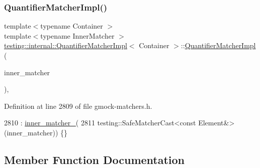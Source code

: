 \subsubsection{\texorpdfstring{Quantifier\+Matcher\+Impl()}{QuantifierMatcherImpl()}}
{\footnotesize\ttfamily template$<$typename Container $>$ \\
template$<$typename Inner\+Matcher $>$ \\
\hyperlink{classtesting_1_1internal_1_1QuantifierMatcherImpl}{testing\+::internal\+::\+Quantifier\+Matcher\+Impl}$<$ Container $>$\+::\hyperlink{classtesting_1_1internal_1_1QuantifierMatcherImpl}{Quantifier\+Matcher\+Impl} (\begin{DoxyParamCaption}\item[{Inner\+Matcher}]{inner\+\_\+matcher }\end{DoxyParamCaption})\hspace{0.3cm}{\ttfamily [inline]}, {\ttfamily [explicit]}}



Definition at line 2809 of file gmock-\/matchers.\+h.


\begin{DoxyCode}
2810       : \hyperlink{classtesting_1_1internal_1_1QuantifierMatcherImpl_af0ee2a4697f5cb8e937fd29dd75e2a30}{inner\_matcher\_}(
2811            testing::SafeMatcherCast<const Element&>(inner\_matcher)) \{\}
\end{DoxyCode}


\subsection{Member Function Documentation}
\mbox{\label{classtesting_1_1internal_1_1QuantifierMatcherImpl_ad57fcd1799e59217fe40c0144ff024f1}} 
